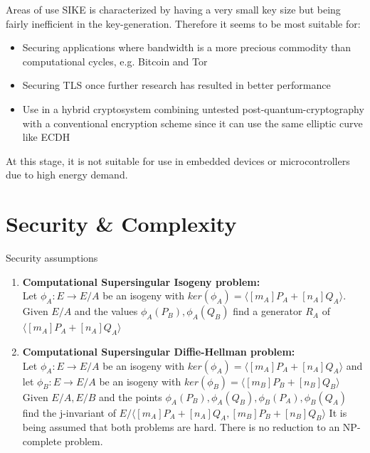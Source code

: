 \documentclass{beamer}
\begin{document}
\begin{frame}{Areas of use}
SIKE is characterized by having a very small key size but being fairly inefficient in the key-generation. Therefore it seems to be most suitable for:
\begin{itemize}[\textbullet]
	
	\item Securing applications where bandwidth is a more precious commodity than computational cycles, e.g. Bitcoin and Tor
	\item Securing TLS once further research has resulted in better performance
	\item Use in a hybrid cryptosystem combining untested post-quantum-cryptography with a conventional encryption scheme since it can use the same elliptic curve like ECDH	
\end{itemize}
At this stage, it is not suitable for use in embedded devices or microcontrollers due to high energy demand.
\end{frame}

\section{Security \& Complexity}

\begin{frame}{Security assumptions} %
\begin{enumerate}[1.]
	\item \textbf{Computational Supersingular Isogeny problem:}\\
	Let $\phi_A:E\to E/A$ be an isogeny with $ker(\phi_A)=\langle [m_A]P_A+[n_A]Q_A\rangle$. Given $E/A$ and the values $\phi_A(P_B),\phi_A(Q_B)$ find a generator $R_A$ of $\langle [m_A]P_A+[n_A]Q_A\rangle$\pause
	\vspace{5mm}
	\item \textbf{Computational Supersingular Diffie-Hellman problem:}\\ 
	Let $\phi_A:E\to E/A$ be an isogeny with $ker(\phi_A)=\langle [m_A]P_A+[n_A]Q_A\rangle$ and let $\phi_B:E\to E/A$ be an isogeny with $ker(\phi_B)=\langle [m_B]P_B+[n_B]Q_B\rangle$
	Given $E/A,E/B$ and the points $\phi_A(P_B),\phi_A(Q_B),\phi_B(P_A),\phi_B(Q_A)$ find the j-invariant of $E/\langle [m_A]P_A+[n_A]Q_A,[m_B]P_B+[n_B]Q_B \rangle$\pause
	\vfill
	It is being assumed that both problems are hard. There is no reduction to an NP-complete problem.
\end{enumerate}
\end{frame}
\end{document}
